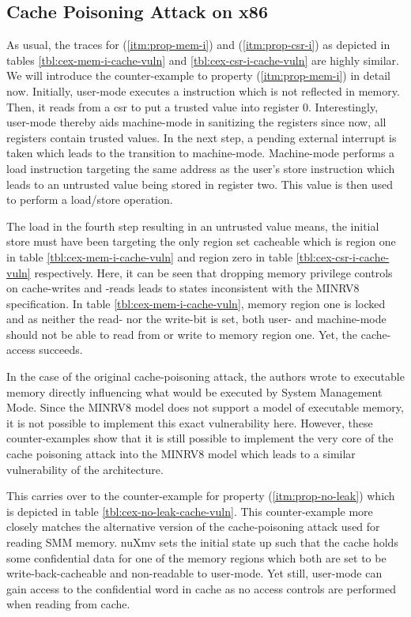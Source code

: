 \subsection{Cache Poisoning Attack on x86}

As usual, the traces for  (\ref{itm:prop-mem-i}) and  (\ref{itm:prop-csr-i}) as depicted in tables \ref{tbl:cex-mem-i-cache-vuln} and \ref{tbl:cex-csr-i-cache-vuln} are highly similar.
We will introduce the counter-example to property  (\ref{itm:prop-mem-i}) in detail now.
Initially, user-mode executes a  instruction which is not reflected in memory.
Then, it reads from a \gls{csr} to put a trusted value into register 0.
Interestingly, user-mode thereby aids machine-mode in sanitizing the registers since now, all registers contain trusted values.
In the next step, a pending external interrupt is taken which leads to the transition to machine-mode.
Machine-mode performs a load instruction targeting the same address as the user's store instruction which leads to an untrusted value being stored in register two.
This value is then used to perform a load/store operation.

The load in the fourth step resulting in an untrusted value means, the initial store must have been targeting the only region set cacheable which is region one in table \ref{tbl:cex-mem-i-cache-vuln} and region zero in table \ref{tbl:cex-csr-i-cache-vuln} respectively.
Here, it can be seen that dropping memory privilege controls on cache-writes and -reads leads to states inconsistent with the MINRV8 specification.
In table \ref{tbl:cex-mem-i-cache-vuln}, memory region one is locked and as neither the read- nor the write-bit is set, both user- and machine-mode should not be able to read from or write to memory region one.
Yet, the cache-access succeeds.

In the case of the original cache-poisoning attack, the authors wrote to executable memory directly influencing what would be executed by System Management Mode.
Since the MINRV8 model does not support a model of executable memory, it is not possible to implement this exact vulnerability here.
However, these counter-examples show that it is still possible to implement the very core of the cache poisoning attack into the MINRV8 model which leads to a similar vulnerability of the architecture.

This carries over to the counter-example for property  (\ref{itm:prop-no-leak}) which is depicted in table \ref{tbl:cex-no-leak-cache-vuln}.
This counter-example more closely matches the alternative version of the cache-poisoning attack used for reading SMM memory.
nuXmv sets the initial state up such that the cache holds some confidential data for one of the memory regions which both are set to be write-back-cacheable and non-readable to user-mode.
Yet still, user-mode can gain access to the confidential word in cache as no access controls are performed when reading from cache.

